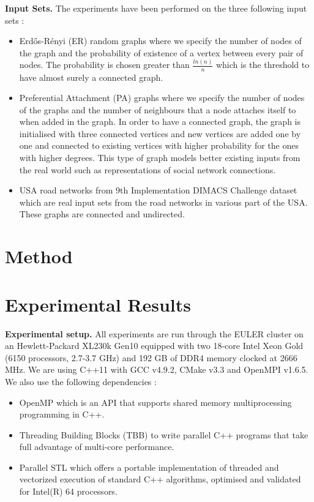 \documentclass[letterpaper]{article}
\newcommand{\mypar}[1]{{\bf #1.}}
\begin{document}
\mypar{Input Sets}
The experiments have been performed on the three following input sets :

\begin{itemize}
    \item Erd\H{o}s-R\'{e}nyi (ER) random graphs where we specify the number of nodes of the graph and the probability of existence of a vertex between every pair of nodes. The probability is chosen greater than $\frac{ln(n)}{n}$ which is the threshold to have almost surely a connected graph.
    \item Preferential Attachment (PA) graphs where we specify the number of nodes of the graphs and the number of neighbours that a node attaches itself to when added in the graph. In order to have a connected graph, the graph is initialised with three connected vertices and new vertices are added one by one and connected to existing vertices with higher probability for the ones with higher degrees. This type of graph models better existing inputs from the real world such as representations of social network connections.  
    \item USA road networks from 9th Implementation DIMACS Challenge dataset which are real input sets from the road networks in various part of the USA. These graphs are connected and undirected.
\end{itemize}

\section{Method}\label{sec:method}


\section{Experimental Results}\label{sec:exp}


\mypar{Experimental setup} All experiments are run through the EULER cluster on an Hewlett-Packard XL230k Gen10 equipped with two 18-core Intel Xeon Gold (6150 processors, 2.7-3.7 GHz) and 192 GB of DDR4 memory clocked at 2666 MHz. We are using C++11 with GCC v4.9.2, CMake v3.3 and OpenMPI v1.6.5. We also use the following dependencies :
\begin{itemize}
    \item OpenMP which is an API that supports shared memory multiprocessing programming in C++.
    \item Threading Building Blocks (TBB) to write parallel C++ programs that take full advantage of multi-core performance.
    \item Parallel STL which offers a portable implementation of threaded and vectorized execution of standard C++ algorithms, optimised and validated for Intel(R) 64 processors.
\end{itemize}
\end{document}

